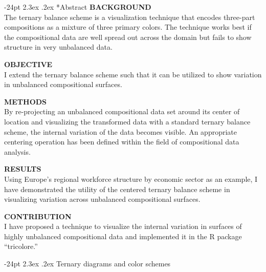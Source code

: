 \documentclass[10pt, twoside, parskip=half]{article}
\title{\large\textbf{The centered ternary balance scheme: A technique to visualize surfaces
of unbalanced three-part compositions}\vskip 0em}
\date{\vspace{-5ex}}
\makeatletter
\renewcommand\section{\@startsection {section}{1}{\z@}%
                                   {-24pt}%
                                   {2.3ex \@plus.2ex}%
                                   {\normalfont\large\bfseries}}
\makeatother
\begin{document}
  \maketitle

\vspace*{-24pt}
\vspace*{5mm}
\setlength{\parskip}{0.5em}
\section*{Abstract}
  \noindent\textbf{BACKGROUND}\\
  The ternary balance scheme is a visualization technique that encodes
  three-part compositions as a mixture of three primary colors. The
  technique works best if the compositional data are well spread out
  across the domain but fails to show structure in very unbalanced data.
  \par
  \noindent\textbf{OBJECTIVE}\\
  I extend the ternary balance scheme such that it can be utilized to show
  variation in unbalanced compositional surfaces.
  \par
  \noindent\textbf{METHODS}\\
  By re-projecting an unbalanced compositional data set around its center
  of location and visualizing the transformed data with a standard ternary
  balance scheme, the internal variation of the data becomes visible. An
  appropriate centering operation has been defined within the field of
  compositional data analysis.
  \par
  \noindent\textbf{RESULTS}\\
  Using Europe's regional workforce structure by economic sector as an
  example, I have demonstrated the utility of the centered ternary balance
  scheme in visualizing variation across unbalanced compositional
  surfaces.
  \par
  \noindent\textbf{CONTRIBUTION}\\
  I have proposed a technique to visualize the internal variation in
  surfaces of highly unbalanced compositional data and implemented it in
  the R package ``tricolore.''
\vspace*{12pt}

\setlength{\parskip}{0ex}

\hypertarget{ternary-diagrams-and-color-schemes}{%
\section{Ternary diagrams and color
schemes}\label{ternary-diagrams-and-color-schemes}}
\end{document}
